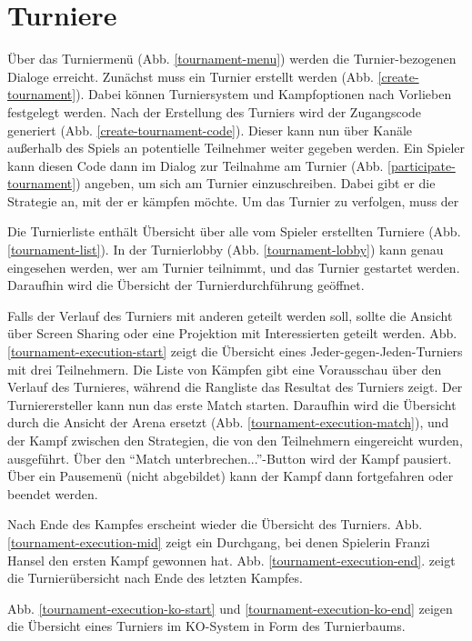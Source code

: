 \section{Turniere}

Über das Turniermenü (Abb. \ref{tournament-menu}) werden die Turnier-bezogenen Dialoge erreicht.
Zunächst muss ein Turnier erstellt werden (Abb. \ref{create-tournament}). Dabei können
Turniersystem und Kampfoptionen nach Vorlieben festgelegt werden. Nach der Erstellung des Turniers
wird der Zugangscode generiert (Abb. \ref{create-tournament-code}). Dieser kann nun über Kanäle
außerhalb des Spiels an potentielle Teilnehmer weiter gegeben werden. Ein Spieler kann diesen Code
dann im Dialog zur Teilnahme am Turnier (Abb. \ref{participate-tournament}) angeben, um sich am
Turnier einzuschreiben. Dabei gibt er die Strategie an, mit der er kämpfen möchte. Um das Turnier zu
verfolgen, muss der 

Die Turnierliste enthält Übersicht über alle vom Spieler erstellten Turniere (Abb.
\ref{tournament-list}). In der Turnierlobby (Abb. \ref{tournament-lobby}) kann genau eingesehen
werden, wer am Turnier teilnimmt, und das Turnier gestartet werden. Daraufhin wird die Übersicht der
Turnierdurchführung geöffnet.

Falls der Verlauf des Turniers mit anderen geteilt werden soll, sollte
die Ansicht über Screen Sharing oder eine Projektion mit Interessierten geteilt werden. Abb.
\ref{tournament-execution-start} zeigt die Übersicht eines Jeder-gegen-Jeden-Turniers mit drei
Teilnehmern. Die Liste von Kämpfen gibt eine Vorausschau über den Verlauf des Turnieres, während
die Rangliste das Resultat des Turniers zeigt. Der Turnierersteller kann nun das erste Match
starten. Daraufhin wird die Übersicht durch die Ansicht der Arena ersetzt (Abb.
\ref{tournament-execution-match}), und der Kampf zwischen den Strategien, die von den Teilnehmern
eingereicht wurden, ausgeführt. Über den \enquote{Match unterbrechen...}-Button wird der Kampf
pausiert. Über ein Pausemenü (nicht abgebildet) kann der Kampf dann fortgefahren oder beendet werden.

Nach Ende des Kampfes erscheint wieder die Übersicht des Turniers. Abb.
\ref{tournament-execution-mid} zeigt ein Durchgang, bei denen Spielerin Franzi Hansel den ersten
Kampf gewonnen hat. Abb. \ref{tournament-execution-end}. zeigt die Turnierübersicht nach Ende des
letzten Kampfes.

Abb.
\ref{tournament-execution-ko-start} und \ref{tournament-execution-ko-end} zeigen die
Übersicht eines Turniers im KO-System in Form des Turnierbaums.

